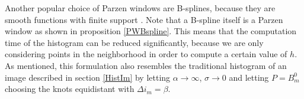  Another popular choice of Parzen windows are B-splines, because they are smooth functions with finite support \cite{the.00}. Note that a B-spline itself is a Parzen window as shown in proposition \ref{PWBspline}. This means that the computation time of the histogram can be reduced significantly, because we are only considering points in the neighborhood in order to compute a certain value of $h$.\\
As mentioned, this formulation also resembles the traditional histogram of an image described in section \ref{HistIm} by letting $\alpha\to\infty$, $\sigma\to 0$ and letting $P=B_m^0$ choosing the knots equidistant with $\Delta i_m = \beta$.